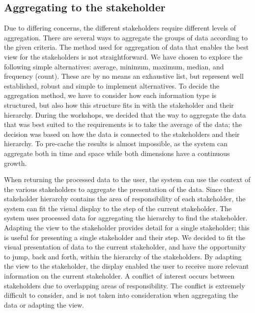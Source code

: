 
\subsection{Aggregating to the stakeholder} %
\label{sub:disc_aggregating_to_the_stakeholder}
Due to differing concerns, the different stakeholders 
require different levels of aggregation. There are several ways to 
aggregate the groups of data according to the given criteria. The method used 
for aggregation of data that enables the best view for the stakeholders is not 
straightforward. We have chosen to explore the following simple alternatives: 
average, minimum, maximum, median, and frequency (count). These are by no 
means an exhaustive list, but represent well established, robust and simple to 
implement alternatives. To decide the aggregation method, we have to consider 
how each information type is structured, but also how this structure fits in 
with the stakeholder and their hierarchy. During the workshops, we decided 
that the way to aggregate the data that was best suited to the requirements is 
to take the average of the data; the decision was based on how the data is connected to 
the stakeholders and their hierarchy. To pre-cache the results is almost 
impossible, as the system can aggregate both in time and space while both 
dimensions have a continuous growth.

When returning the processed data to the user, the system can use the 
context of the various stakeholders to aggregate the presentation of the data. 
Since the stakeholder hierarchy contains the area of responsibility of each 
stakeholder, the system can fit the visual display to the step of the current 
stakeholder. The system uses processed data for aggregating the hierarchy to 
find the stakeholder. Adapting the view to the stakeholder provides detail for 
a single stakeholder; this is useful for presenting a single stakeholder and 
their step.
We decided to fit the visual presentation of data 
to the current stakeholder, and have the opportunity to jump, back and forth, 
within the hierarchy of the stakeholders. By adapting the view to the 
stakeholder, the display enabled the user to receive more relevant information 
on the current stakeholder. A conflict of interest occurs between stakeholders 
due to overlapping areas of responsibility. The conflict is extremely difficult 
to consider, and is not taken into consideration when aggregating the data or 
adapting the view.


